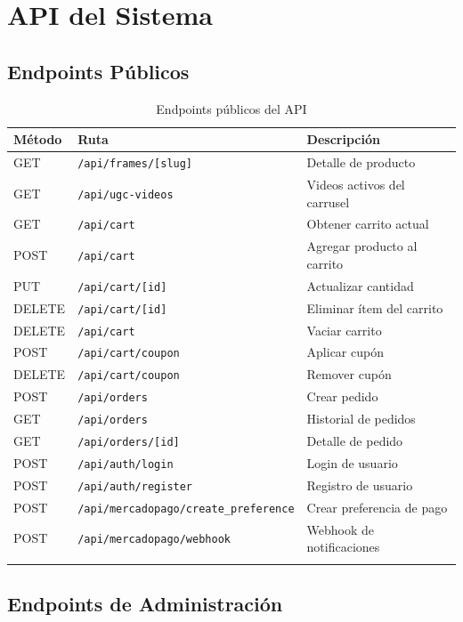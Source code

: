 \documentclass[12pt, a4paper]{article}
\begin{document}
\section{API del Sistema}

\subsection{Endpoints P\'{u}blicos}

\begin{longtable}{lll}
\toprule
\textbf{M\'{e}todo} & \textbf{Ruta} & \textbf{Descripci\'{o}n} \\
\midrule
\endhead
GET & \texttt{/api/frames/[slug]} & Detalle de producto \\
GET & \texttt{/api/ugc-videos} & Videos activos del carrusel \\
GET & \texttt{/api/cart} & Obtener carrito actual \\
POST & \texttt{/api/cart} & Agregar producto al carrito \\
PUT & \texttt{/api/cart/[id]} & Actualizar cantidad \\
DELETE & \texttt{/api/cart/[id]} & Eliminar \'{i}tem del carrito \\
DELETE & \texttt{/api/cart} & Vaciar carrito \\
POST & \texttt{/api/cart/coupon} & Aplicar cup\'{o}n \\
DELETE & \texttt{/api/cart/coupon} & Remover cup\'{o}n \\
POST & \texttt{/api/orders} & Crear pedido \\
GET & \texttt{/api/orders} & Historial de pedidos \\
GET & \texttt{/api/orders/[id]} & Detalle de pedido \\
POST & \texttt{/api/auth/login} & Login de usuario \\
POST & \texttt{/api/auth/register} & Registro de usuario \\
POST & \texttt{/api/mercadopago/create\_preference} & Crear preferencia de pago \\
POST & \texttt{/api/mercadopago/webhook} & Webhook de notificaciones \\
\bottomrule
\caption{Endpoints p\'{u}blicos del API}
\end{longtable}

\subsection{Endpoints de Administraci\'{o}n}
\end{document}
